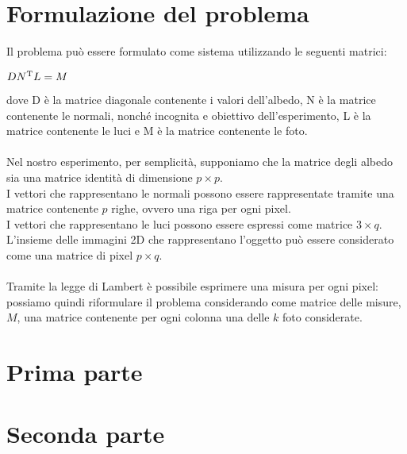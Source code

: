 \documentclass[]{scrartcl}
\begin{document}
\section{Formulazione del problema}
Il problema può essere formulato come sistema utilizzando le seguenti matrici:
\begin{center}
	$DN\textsuperscript{T}L = M$
\end{center}
dove D è la matrice diagonale contenente i valori dell'albedo, N è la matrice contenente le normali, nonché incognita e obiettivo dell'esperimento, L è la matrice contenente le luci e M è la matrice contenente le foto.\\\\
Nel nostro esperimento, per semplicità, supponiamo che la matrice degli albedo sia una matrice identità di dimensione $p \times p$.\\
I vettori che rappresentano le normali possono essere rappresentate tramite una matrice contenente $p$ righe, ovvero una riga per ogni pixel.\\ %
I vettori che rappresentano le luci possono essere espressi come matrice $3 \times q$.\\
L'insieme delle immagini 2D che rappresentano l'oggetto può essere considerato come una matrice di pixel $p \times q$.\\\\
Tramite la legge di Lambert è possibile esprimere una misura per ogni pixel: possiamo quindi riformulare il problema considerando come matrice delle misure, $M$, una matrice contenente per ogni colonna una delle $k$ foto considerate.

\section{Prima parte} %
\section{Seconda parte}%
\end{document}
